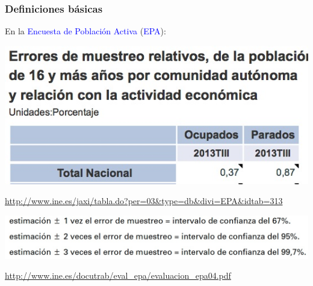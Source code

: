 \documentclass[12pt,t]{beamer}\usepackage[]{graphicx}\usepackage[]{color}
\newcommand{\blue}[1]{\textcolor{blue}{#1}}
\theoremstyle{plain}
\theoremstyle{definition}
\begin{document}
\begin{frame}
\frametitle{Definiciones básicas}

En la \blue{Encuesta de Población Activa} (\blue{EPA}):

\begin{center}
\includegraphics[width=0.6\linewidth]{EPA1}

{\scriptsize \url{http://www.ine.es/jaxi/tabla.do?per=03&type=db&divi=EPA&idtab=313}}
\medskip

\includegraphics[width=\linewidth]{EPA2}


{\scriptsize \url{http://www.ine.es/docutrab/eval_epa/evaluacion_epa04.pdf}}
\end{center}
\end{frame}
\end{document}
